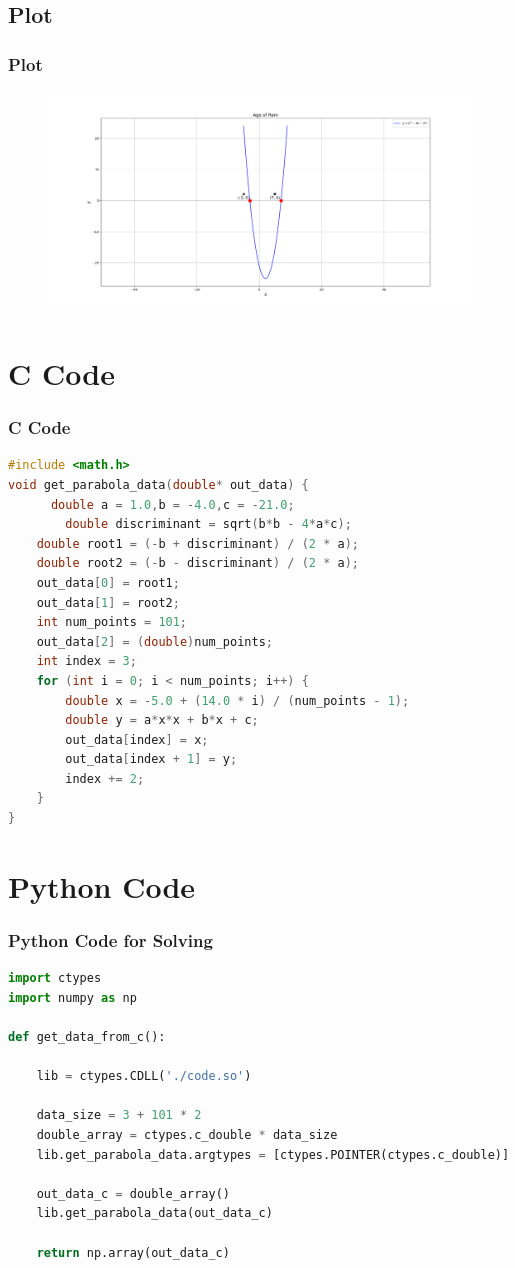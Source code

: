\documentclass{beamer}
\theoremstyle{remark}
\numberwithin{equation}{section}
\begin{document}
\subsection{Plot}
\begin{frame}[fragile]
\frametitle{Plot}

\begin{figure}[h!]
   \centering
   \includegraphics[width=0.7\columnwidth]{figs/fig1.png}
	\caption{}
   \label{}
\end{figure}
\end{frame}

\section{C Code}
\begin{frame}[fragile]
\frametitle{C Code}
\begin{lstlisting}[language=C]
#include <math.h>
void get_parabola_data(double* out_data) {
      double a = 1.0,b = -4.0,c = -21.0;
        double discriminant = sqrt(b*b - 4*a*c);
    double root1 = (-b + discriminant) / (2 * a);
    double root2 = (-b - discriminant) / (2 * a);
    out_data[0] = root1;
    out_data[1] = root2;
    int num_points = 101;
    out_data[2] = (double)num_points;
    int index = 3;
    for (int i = 0; i < num_points; i++) {
        double x = -5.0 + (14.0 * i) / (num_points - 1);
        double y = a*x*x + b*x + c;
        out_data[index] = x;
        out_data[index + 1] = y;
        index += 2;
    }
}

    \end{lstlisting}
\end{frame}

\section{Python Code}
\begin{frame}[fragile]
\frametitle{Python Code for Solving}
\begin{lstlisting}[language=Python]
import ctypes
import numpy as np

def get_data_from_c():

    lib = ctypes.CDLL('./code.so')

    data_size = 3 + 101 * 2
    double_array = ctypes.c_double * data_size
    lib.get_parabola_data.argtypes = [ctypes.POINTER(ctypes.c_double)]

    out_data_c = double_array()
    lib.get_parabola_data(out_data_c)

    return np.array(out_data_c)


\end{lstlisting}
\end{frame}
\end{document}
